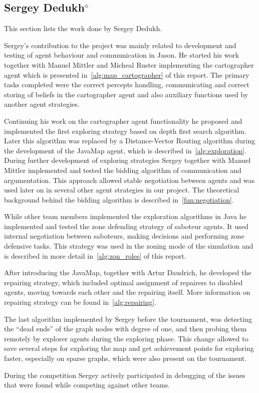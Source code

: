 \subsection[Sergey Dedukh]{Sergey Dedukh$^{\diamond}$}
This section lists the work done by Sergey Dedukh.

Sergey's contribution to the project was mainly related to development and testing of agent behaviour and communication in Jason.
He started his work together with Manuel Mittler and Micheal Ruster implementing the cartographer agent which is presented in~\autoref{alg:map_cartographer} of this report.
The primary tasks completed were the correct percepts handling, communicating and correct storing of beliefs in the cartographer agent and also auxiliary functions used by another agent strategies.  

Continuing his work on the cartographer agent functionality he proposed and implemented the first exploring strategy based on depth first search algorithm.
Later this algorithm was replaced by a Distance-Vector Routing algorithm during the development of the JavaMap agent, which is described in~\autoref{alg:exploration}.
During further development of exploring strategies Sergey together with Manuel Mittler implemented and tested the bidding algorithm of communication and argumentation.
This approach allowed stable negotiation between agents and was used later on in several other agent strategies in our project. 
The theoretical background behind the bidding algorithm is described in~\autoref{fun:negotiation}.

While other team members implemented the exploration algorithms in Java he implemented and tested the zone defending strategy of saboteur agents.
It used internal negotiation between saboteurs, making decisions and performing zone defensive tasks.
This strategy was used in the zoning mode of the simulation and is described in more detail in~\autoref{alg:zon_roles} of this report.

After introducing the JavaMap, together with Artur Daudrich, he developed the repairing strategy, which included optimal assignment of repairers to disabled agents, moving towards each other and the repairing itself.
More information on repairing strategy can be found in~\autoref{alg:repairing}.

The last algorithm implemented by Sergey before the tournament, was detecting the ``dead ends'' of the graph nodes with degree of one, and then probing them remotely by explorer agents during the exploring phase. This change allowed to save several steps for exploring the map and get achievement points for exploring faster, especially on sparse graphs, which were also present on the tournament.

During the competition Sergey actively participated in debugging of the issues that were found while competing against other teams. 